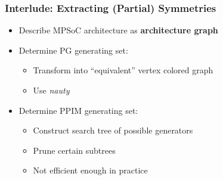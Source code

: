\documentclass{beamer}
\begin{document}
\begin{frame}
  \frametitle{Interlude: Extracting (Partial) Symmetries}

  \begin{itemize}
    \setlength\itemsep{.25cm}

    \item<1-> Describe MPSoC architecture as \textbf{architecture graph}

    \item<2-> Determine PG generating set:
      \begin{itemize}
        \item<3-> Transform into ``equivalent'' vertex colored graph
        \item<4-> Use \textit{nauty}~\cite{nauty}
      \end{itemize}
    \item<5-> Determine PPIM generating set:
      \begin{itemize}
        \item<6-> Construct search tree of possible generators
        \item<7-> Prune certain subtrees
        \item<8-> Not efficient enough in practice
      \end{itemize}
  \end{itemize}
\end{frame}
\end{document}
